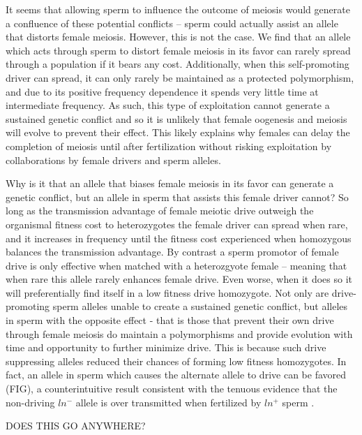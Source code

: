 \documentclass[12pt,letterpaper]{article}
\newcommand{\yb}[1]{{ \color{blue} #1}}
\begin{document}
It seems that allowing sperm to influence the outcome of meiosis would generate a confluence of these potential conflicts -- 
	sperm could actually assist an allele that distorts female meiosis.
However, this is not the case.
We find that an allele which acts through sperm to distort female meiosis in its favor %
	can rarely spread through a population if it bears any cost. 
Additionally, when this self-promoting driver can spread, it can only rarely 
	be maintained as a protected polymorphism, and due to its positive frequency dependence 
	it spends very little time at intermediate frequency.
As such, this type of exploitation cannot generate a sustained genetic conflict and so it is unlikely
	that female oogenesis and meiosis will evolve to prevent their effect.  
This likely explains why females can delay the completion of meiosis until after fertilization 
	without risking exploitation by collaborations by female
        drivers and sperm alleles.

Why is it that an allele that biases female meiosis in its favor can generate a genetic conflict, but an allele in sperm that assists this female driver cannot? 
So long as the transmission advantage of female meiotic drive outweigh the organismal fitness cost to heterozygotes the female driver can spread when rare, and it increases in 		
	frequency until the fitness cost experienced when homozygous balances the transmission advantage.
By contrast a sperm promotor of female drive is only effective when matched with a heterozgyote female -- meaning that when rare this allele rarely enhances female drive. 
Even worse, when it does so it will preferentially find itself in a low fitness drive homozygote. 
Not only are drive-promoting sperm alleles unable to create a sustained genetic conflict, 
	but alleles in sperm with the opposite effect - that is those that prevent their own drive through female meiosis do maintain a polymorphisms and 
	provide evolution  with time and opportunity to further minimize drive.
This is because such drive suppressing alleles reduced their chances of forming  low fitness homozygotes.
In fact, an allele in sperm which causes the alternate allele to drive can be favored (FIG), a counterintuitive result 
	consistent with the tenuous evidence that the non-driving
        $ln^-$ allele is over transmitted when fertilized by $ln^+$
        sperm \cite{agulnick, Pomiankowski1993}. 

\yb{DOES THIS GO ANYWHERE? }
\end{document}
